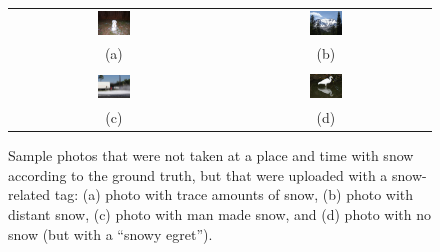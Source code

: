 \begin{figure}[th!]
\begin{center}
\begin{tabular}{cc}
\includegraphics[width=0.16\textwidth]{plots/alittlesnow.jpg} &			%
\includegraphics[width=0.16\textwidth]{plots/distantsnow.jpg} \\			%
(a) & (b) \\ \\
\includegraphics[width=0.16\textwidth]{plots/manmadesnow.jpg} &            %
\includegraphics[width=0.16\textwidth]{plots/nosnow.jpg} \\                     %
(c) & (d) \\
\end{tabular}
\end{center}
\vspace{-15pt}
\caption{Sample photos that were not taken at a place and time with snow according to the ground truth, but that were uploaded with a snow-related tag:
  (a) photo with trace amounts of snow, (b) photo with distant snow, (c) photo with man made snow, and (d) photo with no snow (but with a ``snowy egret'').}
\label{fig:casestudysample}
\end{figure}

